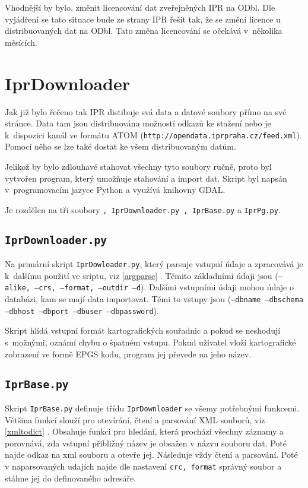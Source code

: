 Vhodnější by bylo, změnit licencování dat zveřejněných IPR na ODbl.
Dle vyjádření se tato situace bude ze strany IPR řešit tak, že se změní 
licence u distribuovaných dat na ODbl. Tato změna licencování se očekává 
v~několika měsících.


\section{IprDownloader}
\label{Iprdownloader}
Jak již bylo řečeno tak IPR distibuje svá data a datové soubory přímo na své 
stránce. Data tam jsou distribuována možností odkazů ke stažení nebo je
k~dispozici kanál ve formátu ATOM ({\tt http://opendata.iprpraha.cz/feed.xml}).
Pomocí něho se lze také dostat ke všem distribuovaným datům.

Jelikož by bylo zdlouhavé stahovat všechny tyto soubory ručně, proto byl
vytvořen program, který umožňuje stahování a import dat. Skript byl napsán
v~programovacím jazyce Python a využívá knihovny GDAL.

Je rozdělen na tři soubory 
{\tt , IprDownloader.py , IprBase.py} a {\tt IprPg.py}.


\subsection{{\tt IprDownloader.py}}
Na primární skript {\tt IprDowloader.py}, který parsuje vstupní údaje a
zpracovává je k~dalšímu použití ve sriptu, viz \ref{argparse} .
Těmito základními údaji jsou
({\tt ---alike, ---crs, ---format, ---outdir ---d}). Dalšími vstupními údaji mohou
údaje o databázi, kam se mají data importovat. Těmi to vstupy jsou
({\tt ---dbname ---dbschema ---dbhost ---dbport ---dbuser ---dbpassword}).

Skript hlídá vstupní formát kartografických souřadnic a pokud se neshodují
s~možnými, oznámí chybu o špatném vstupu. Pokud uživatel vloží kartografické
zobrazení ve formě EPGS kodu, program jej převede na jeho název.


\subsection{{\tt IprBase.py}}
Skript {\tt IprBase.py} definuje třídu {\tt IprDownloader} se všemy 
potřebnými funkcemi. Většina funkcí slouží pro otevírání, čtení a parsování
XML souborů, viz \ref{xmltodict} .
Obsahuje funkci pro hledání, která prochází všechny záznamy a 
porovnává, zda vstupní přibližný název je obsažen v názvu souboru dat. Poté 
najde odkaz na xml souboru a otevře jej. Následuje vždy čtení a parsování. 
Poté v naparsovaných udajích najde dle nastavení {\tt crc, format} správný soubor 
a stáhne jej do definovaného adresáře.



